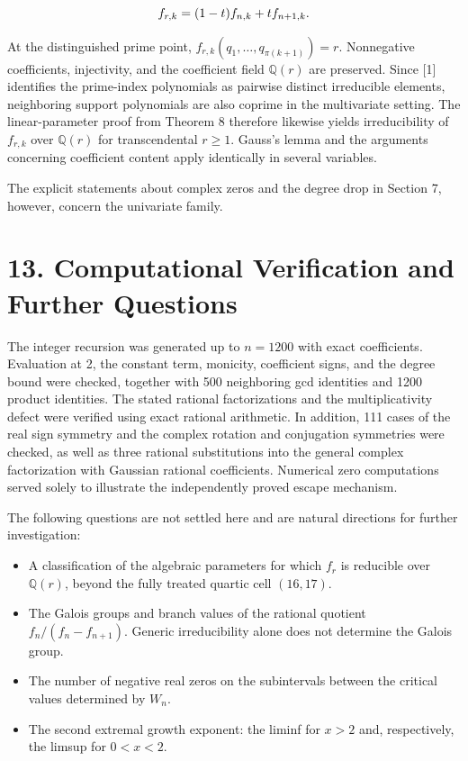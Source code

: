 \documentclass[11pt,a4paper]{article}
\newcommand{\fitmath}[1]{\begingroup\setbox0=\hbox{$\displaystyle #1$}\ifdim\wd0>\linewidth\resizebox{\linewidth}{!}{\box0}\else\box0\fi\endgroup}
\begin{document}
\[
\fitmath{f_{r,k}=(1-t)f_{n,k}+t f_{n+1,k}.}
\]


At the distinguished prime point, $f_{r,k}(q_1,\ldots,q_{\pi(k+1)})=r$. Nonnegative coefficients, injectivity, and the coefficient field $\mathbb Q(r)$ are preserved. Since [1] identifies the prime-index polynomials as pairwise distinct irreducible elements, neighboring support polynomials are also coprime in the multivariate setting. The linear-parameter proof from Theorem 8 therefore likewise yields irreducibility of $f_{r,k}$ over $\mathbb Q(r)$ for transcendental $r\geq1$. Gauss's lemma and the arguments concerning coefficient content apply identically in several variables.


The explicit statements about complex zeros and the degree drop in Section 7, however, concern the univariate family.


\section*{13. Computational Verification and Further Questions}

The integer recursion was generated up to $n=1200$ with exact coefficients. Evaluation at 2, the constant term, monicity, coefficient signs, and the degree bound were checked, together with 500 neighboring gcd identities and 1200 product identities. The stated rational factorizations and the multiplicativity defect were verified using exact rational arithmetic. In addition, 111 cases of the real sign symmetry and the complex rotation and conjugation symmetries were checked, as well as three rational substitutions into the general complex factorization with Gaussian rational coefficients. Numerical zero computations served solely to illustrate the independently proved escape mechanism.


The following questions are not settled here and are natural directions for further investigation:


\begin{itemize}

\item A classification of the algebraic parameters for which $f_r$ is reducible over $\mathbb Q(r)$, beyond the fully treated quartic cell $(16,17)$.

\item The Galois groups and branch values of the rational quotient $f_n/(f_n-f_{n+1})$. Generic irreducibility alone does not determine the Galois group.

\item The number of negative real zeros on the subintervals between the critical values determined by $W_n$.

\item The second extremal growth exponent: the liminf for $x>2$ and, respectively, the limsup for $0<x<2$.

\end{itemize}
\end{document}
